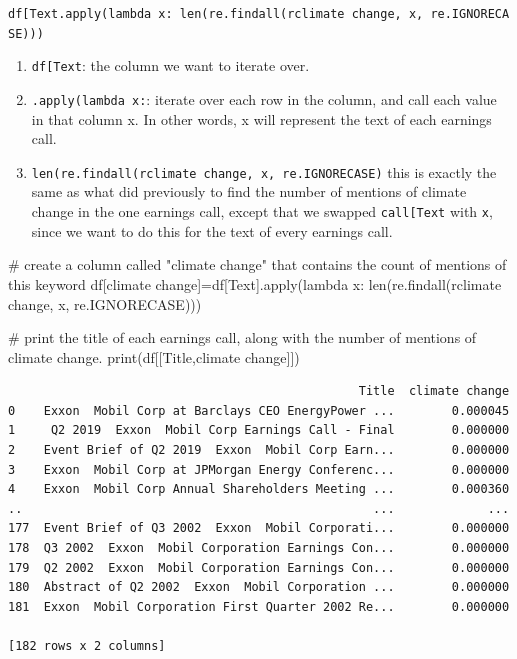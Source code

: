 \documentclass[
  letterpaper,
  DIV=11,
  numbers=noendperiod]{scrreprt}
\newenvironment{Shaded}{\begin{snugshade}}{\end{snugshade}}
\newcommand{\BuiltInTok}[1]{\textcolor[rgb]{0.00,0.23,0.31}{#1}}
\newcommand{\CommentTok}[1]{\textcolor[rgb]{0.37,0.37,0.37}{#1}}
\newcommand{\KeywordTok}[1]{\textcolor[rgb]{0.00,0.23,0.31}{#1}}
\newcommand{\NormalTok}[1]{\textcolor[rgb]{0.00,0.23,0.31}{#1}}
\newcommand{\OperatorTok}[1]{\textcolor[rgb]{0.37,0.37,0.37}{#1}}
\newcommand{\StringTok}[1]{\textcolor[rgb]{0.13,0.47,0.30}{#1}}
\newcommand{\VerbatimStringTok}[1]{\textcolor[rgb]{0.13,0.47,0.30}{#1}}
\providecommand{\tightlist}{%
  \setlength{\itemsep}{0pt}\setlength{\parskip}{0pt}}\usepackage{longtable,booktabs,array}
\begin{document}
\texttt{df{[}\textquotesingle{}Text\textquotesingle{}{]}.apply(lambda\ x:\ len(re.findall(r\textquotesingle{}climate\ change\textquotesingle{},\ x,\ re.IGNORECASE)))}

\begin{enumerate}
\def\labelenumi{\arabic{enumi}.}
\tightlist
\item
  \texttt{df{[}\textquotesingle{}Text\textquotesingle{}{]}}: the column
  we want to iterate over.
\item
  \texttt{.apply(lambda\ x:}: iterate over each row in the column, and
  call each value in that column x. In other words, x will represent the
  text of each earnings call.
\item
  \texttt{len(re.findall(r\textquotesingle{}climate\ change\textquotesingle{},\ x,\ re.IGNORECASE)}
  this is exactly the same as what did previously to find the number of
  mentions of climate change in the one earnings call, except that we
  swapped \texttt{call{[}\textquotesingle{}Text\textquotesingle{}{]}}
  with \texttt{x}, since we want to do this for the text of every
  earnings call.
\end{enumerate}

\begin{Shaded}
\begin{Highlighting}[]
\CommentTok{\# create a column called "climate change" that contains the count of mentions of this keyword}
\NormalTok{df[}\StringTok{\textquotesingle{}climate change\textquotesingle{}}\NormalTok{]}\OperatorTok{=}\NormalTok{df[}\StringTok{\textquotesingle{}Text\textquotesingle{}}\NormalTok{].}\BuiltInTok{apply}\NormalTok{(}\KeywordTok{lambda}\NormalTok{ x: }\BuiltInTok{len}\NormalTok{(re.findall(}\VerbatimStringTok{r\textquotesingle{}climate change\textquotesingle{}}\NormalTok{, x, re.IGNORECASE)))}

\CommentTok{\# print the title of each earnings call, along with the number of mentions of climate change.}
\BuiltInTok{print}\NormalTok{(df[[}\StringTok{\textquotesingle{}Title\textquotesingle{}}\NormalTok{,}\StringTok{\textquotesingle{}climate change\textquotesingle{}}\NormalTok{]])}
\end{Highlighting}
\end{Shaded}

\begin{verbatim}
                                                 Title  climate change
0    Exxon  Mobil Corp at Barclays CEO EnergyPower ...        0.000045
1     Q2 2019  Exxon  Mobil Corp Earnings Call - Final        0.000000
2    Event Brief of Q2 2019  Exxon  Mobil Corp Earn...        0.000000
3    Exxon  Mobil Corp at JPMorgan Energy Conferenc...        0.000000
4    Exxon  Mobil Corp Annual Shareholders Meeting ...        0.000360
..                                                 ...             ...
177  Event Brief of Q3 2002  Exxon  Mobil Corporati...        0.000000
178  Q3 2002  Exxon  Mobil Corporation Earnings Con...        0.000000
179  Q2 2002  Exxon  Mobil Corporation Earnings Con...        0.000000
180  Abstract of Q2 2002  Exxon  Mobil Corporation ...        0.000000
181  Exxon  Mobil Corporation First Quarter 2002 Re...        0.000000

[182 rows x 2 columns]
\end{verbatim}
\end{document}
